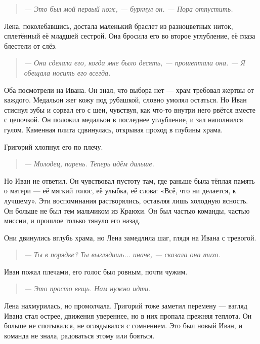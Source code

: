 \documentclass[12pt,a4paper]{book} %
\newenvironment{dialogue}{\begin{quote}\itshape}{\end{quote}}
\begin{document}
\begin{dialogue}
--- Это был мой первый нож, --- буркнул он. --- Пора отпустить.
\end{dialogue}

Лена, поколебавшись, достала маленький браслет из разноцветных ниток, сплетённый её младшей сестрой. Она бросила его во второе углубление, её глаза блестели от слёз.

\begin{dialogue}
--- Она сделала его, когда мне было десять, --- прошептала она. --- Я обещала носить его всегда.
\end{dialogue}

Оба посмотрели на Ивана. Он знал, что выбора нет --- храм требовал жертвы от каждого. Медальон жег кожу под рубашкой, словно умолял остаться. Но Иван стиснул зубы и сорвал его с шеи, чувствуя, как что-то внутри него рвётся вместе с цепочкой. Он положил медальон в последнее углубление, и зал наполнился гулом. Каменная плита сдвинулась, открывая проход в глубины храма.

Григорий хлопнул его по плечу.

\begin{dialogue}
--- Молодец, парень. Теперь идём дальше.
\end{dialogue}

Но Иван не ответил. Он чувствовал пустоту там, где раньше была тёплая память о матери --- её мягкий голос, её улыбка, её слова: «Всё, что ни делается, к лучшему». Эти воспоминания растворялись, оставляя лишь холодную ясность. Он больше не был тем мальчиком из Краюхи. Он был частью команды, частью миссии, и прошлое только тянуло его назад.

Они двинулись вглубь храма, но Лена замедлила шаг, глядя на Ивана с тревогой.

\begin{dialogue}
--- Ты в порядке? Ты выглядишь... иначе, --- сказала она тихо.
\end{dialogue}

Иван пожал плечами, его голос был ровным, почти чужим.

\begin{dialogue}
--- Это просто вещь. Нам нужно идти.
\end{dialogue}

Лена нахмурилась, но промолчала. Григорий тоже заметил перемену --- взгляд Ивана стал острее, движения увереннее, но в них пропала прежняя теплота. Он больше не спотыкался, не оглядывался с сомнением. Это был новый Иван, и команда не знала, радоваться этому или бояться.
\end{document}
